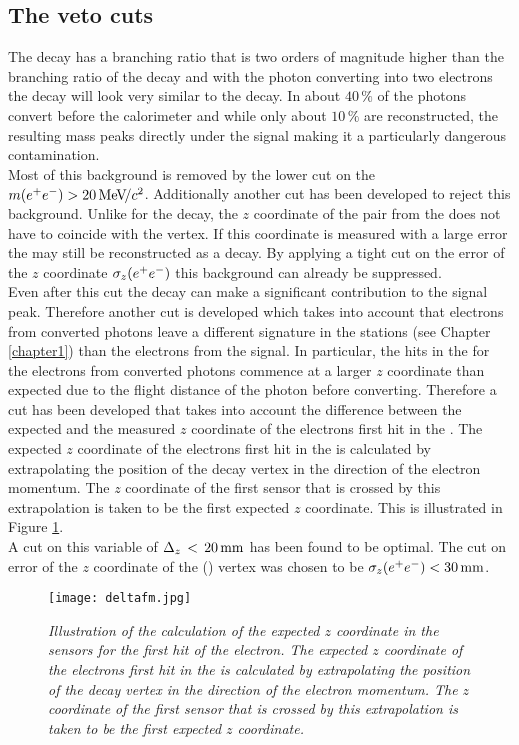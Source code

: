 \subsection{The \BdKstg veto cuts}
The \BdKstg decay has a branching ratio that is two orders of magnitude higher than the branching ratio of the \BdKstee decay and with the photon converting into two electrons the \BdKstg decay will look very similar to the \BdKstee decay. In \lhcb about $40\, \%$ of the photons convert before the calorimeter and while only about $10\, \%$ are reconstructed, the resulting \Bd mass peaks directly under the signal making it a particularly dangerous contamination.\\
Most of this background is removed by the lower cut on the $m(e^+e^-) >20 {\mathrm{\,Me\kern -0.1em V\!/}c^2}$. Additionally another cut has been developed to reject this background. Unlike for the \BdKstee decay, the $z$ coordinate of the \ep \en pair from the \BdKstg does not have to coincide with the \Kstarz vertex. If this coordinate is measured with a large error the \BdKstg may still be reconstructed as a \BdKstee decay. By applying a tight cut on the error of the $z$ coordinate $\sigma_z(e^+e^-)$ this background can already be suppressed.\\
Even after this cut the \BdKstg decay can make a significant contribution to the \BdKstee signal peak. Therefore another cut is developed which takes into account that electrons from converted photons leave a different signature in the \velo stations (see Chapter \ref{chapter1}) than the electrons from the \BdKstee signal. In particular, the hits in the \velo for the electrons from converted photons commence at a larger $z$ coordinate than expected due to the flight distance of the photon before converting. Therefore a cut has been developed that takes into account the difference between the expected and the measured $z$ coordinate of the electrons first hit in the \velo. The expected $z$ coordinate of the electrons first hit in the \velo is calculated by extrapolating the position of the \Kstarz decay vertex in the direction of the electron momentum. The $z$ coordinate of the first \velo sensor that is crossed by this extrapolation is taken to be the first expected $z$ coordinate. This is illustrated in Figure \ref{fig:deltafm}.\\
A cut on this variable of $\Delta_z\, <\, 20 \rm \,mm$ has been found to be optimal. The cut on error of the $z$ coordinate of the (\epem) vertex was chosen to be $\sigma_z(e^+e^-)<30\rm \,mm$. 
\begin{figure}[ht]
\begin{center}
\texttt{[image: deltafm.jpg]}
\end{center}
\caption{\textit{Illustration of the calculation of the expected $z$ coordinate in the \velo sensors for the first hit of the electron. The expected $z$ coordinate of the electrons first hit in the \velo is calculated by extrapolating the position of the \Kstarz decay vertex in the direction of the electron momentum. The $z$ coordinate of the first \velo sensor that is crossed by this extrapolation is taken to be the first expected $z$ coordinate.}}
\label{fig:deltafm}
\end{figure}
